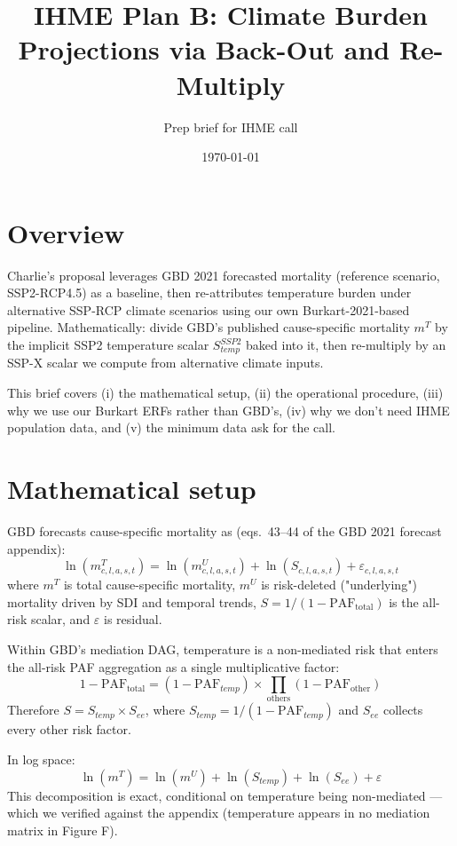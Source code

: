 \documentclass[11pt]{article}
\title{IHME Plan B: Climate Burden Projections via Back-Out and Re-Multiply}
\author{Prep brief for IHME call}
\date{\today}
\begin{document}
\maketitle

\section{Overview}

Charlie's proposal leverages GBD 2021 forecasted mortality (reference scenario, SSP2-RCP4.5) as a baseline, then re-attributes temperature burden under alternative SSP-RCP climate scenarios using our own Burkart-2021-based pipeline. Mathematically: divide GBD's published cause-specific mortality $m^T$ by the implicit SSP2 temperature scalar $S^{SSP2}_{temp}$ baked into it, then re-multiply by an SSP-X scalar we compute from alternative climate inputs.

This brief covers (i) the mathematical setup, (ii) the operational procedure, (iii) why we use our Burkart ERFs rather than GBD's, (iv) why we don't need IHME population data, and (v) the minimum data ask for the call.

\section{Mathematical setup}

GBD forecasts cause-specific mortality as (eqs.~43--44 of the GBD 2021 forecast appendix):
\begin{equation}
\ln(m^T_{c,l,a,s,t}) = \ln(m^U_{c,l,a,s,t}) + \ln(S_{c,l,a,s,t}) + \varepsilon_{c,l,a,s,t}
\end{equation}
where $m^T$ is total cause-specific mortality, $m^U$ is risk-deleted ("underlying") mortality driven by SDI and temporal trends, $S = 1/(1 - \text{PAF}_\text{total})$ is the all-risk scalar, and $\varepsilon$ is residual.

Within GBD's mediation DAG, temperature is a non-mediated risk that enters the all-risk PAF aggregation as a single multiplicative factor:
\begin{equation}
1 - \text{PAF}_\text{total} = (1 - \text{PAF}_{temp}) \times \prod_\text{others}(1 - \text{PAF}_\text{other})
\end{equation}
Therefore $S = S_{temp} \times S_{ee}$, where $S_{temp} = 1/(1 - \text{PAF}_{temp})$ and $S_{ee}$ collects every other risk factor.

In log space:
\begin{equation}
\ln(m^T) = \ln(m^U) + \ln(S_{temp}) + \ln(S_{ee}) + \varepsilon
\end{equation}
This decomposition is exact, conditional on temperature being non-mediated --- which we verified against the appendix (temperature appears in no mediation matrix in Figure F).
\end{document}
